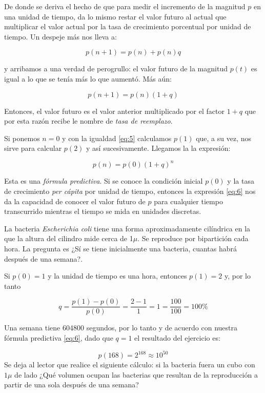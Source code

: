 De donde se deriva el hecho de que para medir el incremento de la magnitud $p$ en una unidad de tiempo, da lo mismo restar el valor futuro al actual que multiplicar el valor actual por la tasa de crecimiento porcentual por unidad de tiempo. Un despeje más nos lleva a:

 \begin{equation} \label{eq:4}
 p(n+1)=p(n)+p(n)q
\end{equation}

\noindent y arribamos a una verdad de perogrullo: el valor futuro de la magnitud $p(t)$ es igual a lo que se tenía más lo que aumentó. Más aún:

 \begin{equation} \label{eq:5}
 p(n+1)=p(n)(1+q)
\end{equation}

Entonces, el valor futuro es el valor anterior multiplicado por el factor $1+q$ que por esta razón recibe le nombre de \emph{tasa de reemplazo}.

Si ponemos $n=0$ y con la igualdad \ref{eq:5} calculamos $p(1)$ que, a su vez, nos sirve para calcular $p(2)$ y así sucesivamente. Llegamos la la expresión:

 \begin{equation} \label{eq:6}
 p(n)=p(0)(1+q)^n
\end{equation}

Esta es una \emph{fórmula predictiva}. Si se conoce la condición inicial $p(0)$ y la tasa de crecimiento \emph{per cápita} por unidad de tiempo, entonces la expresión \ref{eq:6} nos da la capacidad de conocer el valor futuro de $p$ para cualquier tiempo transcurrido mientras el tiempo se mida en unidades discretas.

\begin{ejemplo}
		
		
		\noindent La bacteria \emph{Escherichia coli} tiene una forma aproximadamente cilíndrica en la que la altura del cilindro mide cerca de 1$\mu$. Se reproduce por bipartición cada hora. La pregunta es ¿Sí se tiene inicialmente una bacteria, cuantas habrá después de una semana?.
		
		Si $p(0)=1$ y la unidad de tiempo es una hora, entonces $p(1)=2$ y, por lo tanto 
		 
\begin{equation} \label{eq:7}
 q=\dfrac{p(1)-p(0)}{p(0)}=\dfrac{2-1}{1}=1=\dfrac{100}{100}=100\%
\end{equation}

Una semana tiene 604800 segundos, por lo tanto y de acuerdo con nuestra fórmula predictiva \ref{eq:6}, dado que $q=1$ el resultado del ejercicio es:

\[
p(168)=2^{168}\approx 10^50
\]
Se deja al lector que realice el siguiente cálculo: si la bacteria fuera un cubo con $1\mu$ de lado ¿Qué volumen ocupan las bacterias que resultan de la reproducción a partir de una sola después de una semana?

\end{ejemplo}

